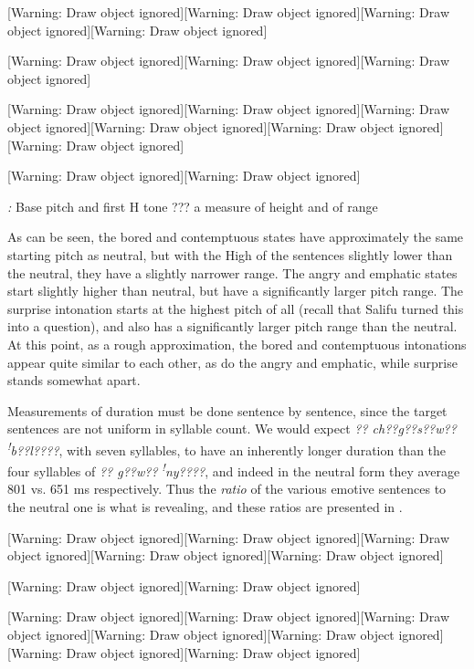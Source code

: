 \documentclass[output=paper]{langsci/langscibook}
\begin{document}
[Warning: Draw object ignored][Warning: Draw object ignored][Warning: Draw object ignored][Warning: Draw object ignored]

[Warning: Draw object ignored][Warning: Draw object ignored][Warning: Draw object ignored]

[Warning: Draw object ignored][Warning: Draw object ignored][Warning: Draw object ignored][Warning: Draw object ignored][Warning: Draw object ignored][Warning: Draw object ignored]

[Warning: Draw object ignored][Warning: Draw object ignored]

\emph{\textup{:}}\textit{ }Base pitch and first H tone ??? a measure of height and of range

As can be seen, the bored and contemptuous states have approximately the same starting pitch as neutral, but with the High of the sentences slightly lower than the neutral, they have a slightly narrower range.  The angry and emphatic states start slightly higher than neutral, but have a significantly larger pitch range.  The surprise intonation starts at the highest pitch of all (recall that Salifu turned this into a question), and also has a significantly larger pitch range than the neutral. At this point, as a rough approximation, the bored and contemptuous intonations appear quite similar to each other, as do the angry and emphatic, while surprise stands somewhat apart. 

Measurements of duration must be done sentence by sentence, since the target sentences are not uniform in syllable count. We would expect\textit{ ?? ch??g??s??w?? }\textit{\textsuperscript{!}}\textit{b??l????}, with seven syllables,\textit{ }to have an inherently longer duration than the four syllables of \textit{?? g??w?? }\textit{\textsuperscript{!}}\textit{ny????}, and indeed in the neutral form they average 801 vs. 651 ms respectively. Thus the \emph{ratio} of the various emotive sentences to the neutral one is what is revealing, and these ratios are presented in . 

[Warning: Draw object ignored][Warning: Draw object ignored][Warning: Draw object ignored][Warning: Draw object ignored][Warning: Draw object ignored]

[Warning: Draw object ignored][Warning: Draw object ignored]

[Warning: Draw object ignored][Warning: Draw object ignored][Warning: Draw object ignored][Warning: Draw object ignored][Warning: Draw object ignored][Warning: Draw object ignored][Warning: Draw object ignored]
\end{document}
